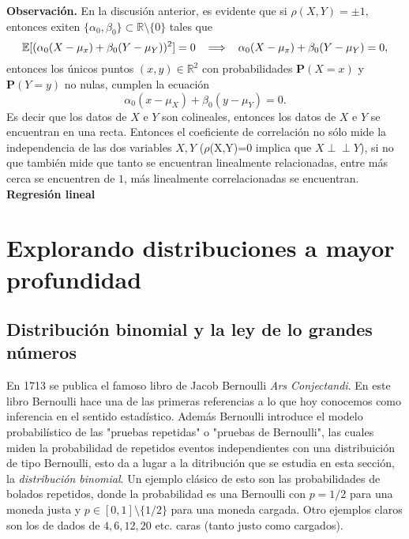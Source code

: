 \documentclass[letterpaper]{book}
\newcommand{\ind}{\perp\!\!\!\!\perp}
\newcommand{\prob}{\textbf{P}}
\newcommand{\esp}{\mathbb E}
\newcommand{\obs}{{\newline \noindent \sc \textbf{Observación. }}}
\newcommand{\re}{\ensuremath{\mathbb R }}
\begin{document}
\obs En la discusión anterior, es evidente que si \(\rho(X,Y)=\pm1\), entonces exiten \(\{\alpha_0,\beta_0\}\subset\re\setminus\{0\}\) tales que
\[
\esp[(\alpha_0(X-\mu_x)+\beta_0(Y-\mu_Y))^2]=0\hspace{0.2cm}\implies\hspace{0.2cm}\alpha_0(X-\mu_x)+\beta_0(Y-\mu_Y)=0,
\]
\noindent entonces los únicos puntos \((x,y)\in\re^2\) con probabilidades \(\prob(X=x)\) y \(\prob(Y=y)\) no nulas, cumplen la ecuación
\[
\alpha_0(x-\mu_X)+\beta_0(y-\mu_Y)=0.
\]
\noindent Es decir que los datos de \(X\) e \(Y\) son colineales, entonces los datos de \(X\) e \(Y\) se encuentran en una recta. Entonces el coeficiente de correlación no sólo mide la independencia de las dos variables \(X,Y\) (\(\rho\)(X,Y)=0 implica que \(X\ind Y\)), si no que también mide que tanto se encuentran linealmente relacionadas, entre más cerca se encuentren de \(1\), más linealmente correlacionadas se encuentran.\vspace{0.5cm}
\noindent \textbf{\Large Regresión lineal}
\vspace{0.5cm}
\chapter{Explorando distribuciones a mayor profundidad}
\label{sec:orgf1f39fe}

\section{Distribución binomial y la ley de lo grandes números}
\label{sec:org673d912}
\noindent En 1713 se publica el famoso libro de Jacob Bernoulli \emph{Ars Conjectandi}. En este libro Bernoulli hace una de las primeras referencias a lo que hoy conocemos como inferencia en el sentido estadístico. Además Bernoulli introduce el modelo probabilístico de las "pruebas repetidas" o "pruebas de Bernoulli", las cuales miden la probabilidad de repetidos eventos independientes con una distribuición de tipo Bernoulli, esto da a lugar a la ditribución que se estudia en esta sección, la \emph{distribución binomial}.
Un ejemplo clásico de esto son las probabilidades de bolados repetidos, donde la probabilidad es una Bernoulli con \(p=1/2\) para una moneda justa y \(p\in[0,1]\setminus\{1/2\}\) para una moneda cargada. Otro ejemplos claros son los de dados de \(4,6,12,20\) etc. caras (tanto justo como cargados).
\end{document}
